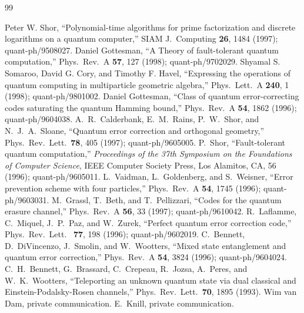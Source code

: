\begin{thebibliography}{99}

 Peter W. Shor, ``Polynomial-time algorithms for prime
factorization and discrete logarithms on a quantum computer,'' SIAM
J.\ Computing {\bf 26}, 1484 (1997); quant-ph/9508027.
 Daniel Gottesman, ``A Theory of fault-tolerant
quantum computation,'' Phys.\ Rev.\ A {\bf 57}, 127 (1998);
quant-ph/9702029. 
 Shyamal S. Somaroo, David G. Cory, and
Timothy F. Havel, ``Expressing the operations of quantum computing in
multiparticle geometric algebra,'' Phys.\ Lett.\ A {\bf 240}, 1
(1998); quant-ph/9801002.
 Daniel Gottesman, ``Class of quantum
error-correcting codes saturating the quantum Hamming bound,'' Phys.\
Rev.\ A {\bf 54}, 1862 (1996); quant-ph/9604038.
 A.~R.~Calderbank, E.~M.~Rains, P.~W.~Shor, and
N.~J.~A.~Sloane, ``Quantum error correction and orthogonal geometry,''
Phys.\ Rev.\ Lett.\ {\bf 78}, 405 (1997); quant-ph/9605005.
 P.~Shor, ``Fault-tolerant quantum computation,''
{\it Proceedings of the 37th Symposium on the Foundations of Computer
Science}, IEEE Computer Society Press, Los Alamitos, CA, 56 (1996);
quant-ph/9605011.
 L.~Vaidman, L.~Goldenberg, and S.~Weisner, ``Error
prevention scheme with four particles,'' Phys.\ Rev.\ A {\bf 54},
1745 (1996); quant-ph/9603031.
 M.~Grassl, T.~Beth, and T.~Pellizzari, ``Codes for
the quantum erasure channel,'' Phys.\ Rev.\ A {\bf 56}, 33 (1997);
quant-ph/9610042.
 R.~Laflamme, C.~Miquel, J.~P.~Paz, and W.~Zurek,
``Perfect quantum error correction code,'' Phys.\ Rev.\ Lett.\ {\bf
77}, 198 (1996); quant-ph/9602019.
 C.~Bennett, D.~DiVincenzo, J.~Smolin, and
W.~Wootters, ``Mixed state entanglement and quantum error
correction,'' Phys.\ Rev.\ A {\bf 54}, 3824 (1996); quant-ph/9604024.
\bibitem{teleport} C.~H.~Bennett, G.~Brassard, C.~Crepeau, R.~Jozsa,
A.~Peres, and W.~K.~Wootters, ``Teleporting an unknown quantum state
via dual classical and Einstein-Podalsky-Rosen channels,'' Phys.\
Rev.\ Lett.\ {\bf 70}, 1895 (1993).
\bibitem{RXOR} Wim van Dam, private communication.
\bibitem{knillsthm} E.~Knill, private communication.

\end{thebibliography}


